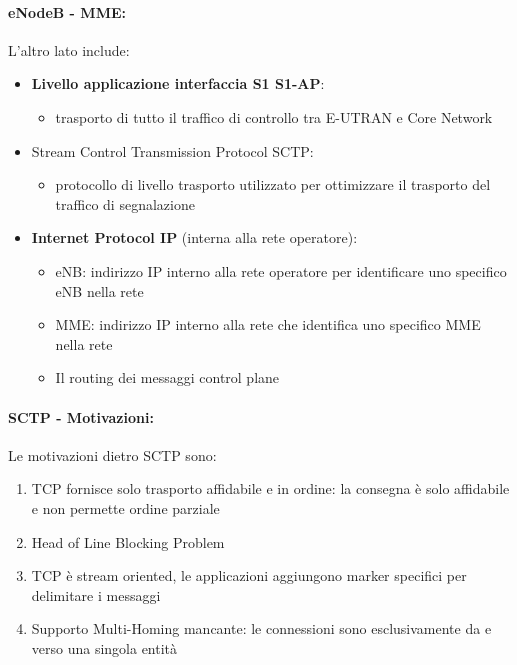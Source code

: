 \paragraph{eNodeB - MME:} L'altro lato include: 
\begin{itemize}
	\item \textbf{Livello applicazione interfaccia S1 S1-AP}:
	\begin{itemize}
		\item trasporto di tutto il traffico di controllo tra E-UTRAN e Core Network
	\end{itemize}
	
	\item Stream Control Transmission Protocol SCTP: 
	\begin{itemize}
		\item protocollo di livello trasporto utilizzato per ottimizzare il trasporto del traffico di segnalazione
	\end{itemize}
	
	\item \textbf{Internet Protocol IP} (interna alla rete operatore):
	\begin{itemize}
		\item eNB: indirizzo IP interno alla rete operatore per identificare uno specifico eNB nella rete
		\item MME: indirizzo IP interno alla rete che identifica uno specifico MME nella rete
		\item Il routing dei messaggi control plane
	\end{itemize}
\end{itemize}

\paragraph{SCTP - Motivazioni:} Le motivazioni dietro SCTP sono:
\begin{enumerate}
	\item TCP fornisce solo trasporto affidabile e in ordine: la consegna è solo affidabile e non permette ordine parziale
	\item Head of Line Blocking Problem
	\item TCP è stream oriented, le applicazioni aggiungono marker specifici per delimitare i messaggi
	\item Supporto Multi-Homing mancante: le connessioni sono esclusivamente da e verso una singola entità
\end{enumerate}

